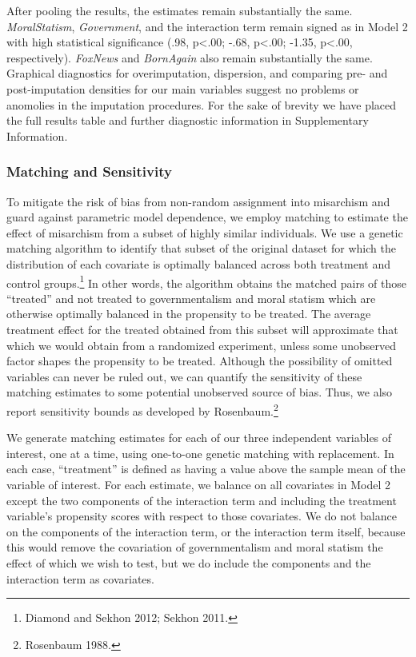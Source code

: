 \documentclass[12pt,]{article}
\begin{document}
After pooling the results, the estimates remain substantially the same.
\emph{MoralStatism}, \emph{Government}, and the interaction term remain
signed as in Model 2 with high statistical significance (.98,
p\textless{}.00; -.68, p\textless{}.00; -1.35, p\textless{}.00,
respectively). \emph{FoxNews} and \emph{BornAgain} also remain
substantially the same. Graphical diagnostics for overimputation,
dispersion, and comparing pre- and post-imputation densities for our
main variables suggest no problems or anomolies in the imputation
procedures. For the sake of brevity we have placed the full results
table and further diagnostic information in Supplementary Information.

\subsubsection{Matching and Sensitivity}\label{matching-and-sensitivity}

To mitigate the risk of bias from non-random assignment into misarchism
and guard against parametric model dependence, we employ matching to
estimate the effect of misarchism from a subset of highly similar
individuals. We use a genetic matching algorithm to identify that subset
of the original dataset for which the distribution of each covariate is
optimally balanced across both treatment and control groups.\footnote{Diamond
  and Sekhon 2012; Sekhon 2011. } In other words, the algorithm obtains
the matched pairs of those ``treated'' and not treated to
governmentalism and moral statism which are otherwise optimally balanced
in the propensity to be treated. The average treatment effect for the
treated obtained from this subset will approximate that which we would
obtain from a randomized experiment, unless some unobserved factor
shapes the propensity to be treated. Although the possibility of omitted
variables can never be ruled out, we can quantify the sensitivity of
these matching estimates to some potential unobserved source of bias.
Thus, we also report sensitivity bounds as developed by
Rosenbaum.\footnote{Rosenbaum 1988. }

We generate matching estimates for each of our three independent
variables of interest, one at a time, using one-to-one genetic matching
with replacement. In each case, ``treatment'' is defined as having a
value above the sample mean of the variable of interest. For each
estimate, we balance on all covariates in Model 2 except the two
components of the interaction term and including the treatment
variable's propensity scores with respect to those covariates. We do not
balance on the components of the interaction term, or the interaction
term itself, because this would remove the covariation of
governmentalism and moral statism the effect of which we wish to test,
but we do include the components and the interaction term as covariates.
\end{document}
